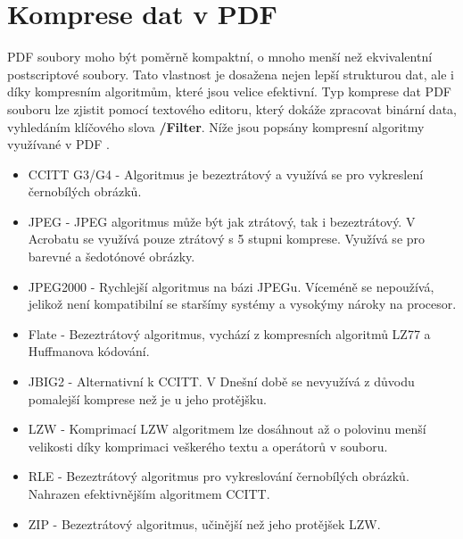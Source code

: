 \section{Komprese dat v PDF}
PDF soubory moho být poměrně kompaktní, o mnoho menší než ekvivalentní postscriptové soubory. Tato vlastnost je dosažena nejen lepší strukturou dat, ale i díky kompresním algoritmům, které jsou velice efektivní. Typ komprese dat PDF souboru lze zjistit pomocí textového editoru, který dokáže zpracovat binární data, vyhledáním klíčového slova \textbf{/Filter}. Níže jsou popsány kompresní algoritmy využívané v PDF \cite{PDFPrepressure}.
\begin{itemize}
	\item CCITT G3/G4 - Algoritmus je bezeztrátový a využívá se pro vykreslení černobílých obrázků.
	\item JPEG - JPEG algoritmus může být jak ztrátový, tak i bezeztrátový. V Acrobatu se využívá pouze ztrátový s 5 stupni komprese. Využívá se pro barevné a šedotónové obrázky.
	\item JPEG2000 - Rychlejší algoritmus na bázi JPEGu. Víceméně se nepoužívá, jelikož není kompatibilní se staršímy systémy a vysokýmy nároky na procesor.
	\item Flate - Bezeztrátový algoritmus, vychází z kompresních algoritmů LZ77 a Huffmanova kódování.
	\item JBIG2 - Alternativní k CCITT. V Dnešní době se nevyužívá z důvodu pomalejší komprese než je u jeho protějšku.
	\item LZW - Komprimací LZW algoritmem lze dosáhnout až o polovinu menší velikosti díky komprimaci veškerého textu a operátorů v souboru.
	\item RLE - Bezeztrátový algoritmus pro vykreslování černobílých obrázků. Nahrazen efektivnějším algoritmem CCITT.
	\item ZIP - Bezeztrátový algoritmus, učinější než jeho protějšek LZW.
\end{itemize}